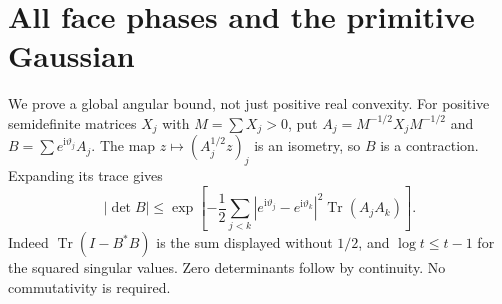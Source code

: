 \documentclass[11pt]{article}
\numberwithin{equation}{section}
\theoremstyle{definition}\newtheorem{definition}[theorem]{Definition}
\theoremstyle{remark}\newtheorem{remark}[theorem]{Remark}
\newcommand{\ii}{\mathrm i}
\begin{document}
\section{All face phases and the primitive Gaussian}\label{sa:angles}
We prove a global angular bound, not just positive real convexity.
For positive semidefinite matrices $X_j$ with $M=\sum X_j>0$, put
$A_j=M^{-1/2}X_jM^{-1/2}$ and $B=\sum e^{\ii\vartheta_j}A_j$.
The map $z\mapsto(A_j^{1/2}z)_j$ is an isometry, so $B$ is a
contraction. Expanding its trace gives
\begin{equation}\label{sa:det-gap}
 |\det B|\le
 \exp\left[-\frac12\sum_{j<k}|e^{\ii\vartheta_j}-e^{\ii\vartheta_k}|^2
                                      \operatorname{Tr}(A_jA_k)\right].
\end{equation}
Indeed $\operatorname{Tr}(I-B^*B)$ is the sum displayed without
$1/2$, and $\log t\le t-1$ for the squared singular values. Zero
determinants follow by continuity. No commutativity is required.
\end{document}
